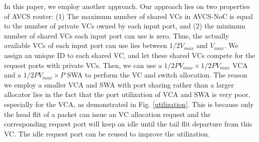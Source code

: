 \documentclass[paper]{ieice}
\begin{document}
In this paper, we employ another approach. Our approach lies on two properties of AVCS router: (1) The maximum number of shared VCs in AVCS-NoC is equal to the number of private VCs owned by each input port, and (2) the minimum number of shared VCs each input port can use is zero. Thus, the actually available VCs of each input port can use lies between $1/2V_{max}$ and $V_{max}$. We assign an unique ID to each shared VC, and let these shared VCs compete for the request ports with private VCs. Then, we can use a $1/2PV_{max}\times 1/2PV_{max}$ VCA and a $1/2PV_{max}\times P$ SWA to perform the VC and switch allocation. The reason we employ a smaller VCA and SWA with port sharing rather than a larger allocator lies in the fact that the port utilization of VCA and SWA is very poor, especially for the VCA, as demonstrated in Fig. \ref{utilization}. This is because only the head flit of a packet can issue an VC allocation request and the corresponding request port will keep on idle until the tail flit departure from this VC. The idle request port can be reused to improve the utilization.
\end{document}
